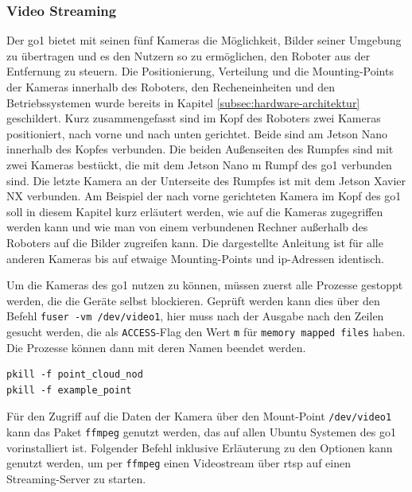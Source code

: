 \subsubsection{Video Streaming}
\label{subsubsec:video-streaming}

Der \gls{go1} bietet mit seinen fünf Kameras die Möglichkeit, Bilder seiner Umgebung zu übertragen und es den Nutzern so
zu ermöglichen, den Roboter aus der Entfernung zu steuern.
Die Positionierung, Verteilung und die Mounting-Points der Kameras innerhalb des Roboters, den Recheneinheiten und den
Betriebssystemen wurde bereits in Kapitel \ref{subsec:hardware-architektur} geschildert.
Kurz zusammengefasst sind im Kopf des Roboters zwei Kameras positioniert, nach vorne und nach unten gerichtet.
Beide sind am Jetson Nano innerhalb des Kopfes verbunden.
Die beiden Außenseiten des Rumpfes sind mit zwei Kameras bestückt, die mit dem Jetson Nano m Rumpf des \gls{go1} verbunden sind.
Die letzte Kamera an der Unterseite des Rumpfes ist mit dem Jetson Xavier NX verbunden.
Am Beispiel der nach vorne gerichteten Kamera im Kopf des \gls{go1} soll in diesem Kapitel kurz erläutert werden,
wie auf die Kameras zugegriffen werden kann und wie man von einem verbundenen Rechner außerhalb des Roboters auf die Bilder
zugreifen kann.
Die dargestellte Anleitung ist für alle anderen Kameras bis auf etwaige Mounting-Points und \gls{ip}-Adressen identisch.


Um die Kameras des \gls{go1} nutzen zu können, müssen zuerst alle Prozesse gestoppt werden, die die Geräte selbst blockieren.
Geprüft werden kann dies über den Befehl \texttt{fuser -vm /dev/\allowbreak video1}, hier muss nach der Ausgabe nach den Zeilen gesucht werden,
die als \texttt{ACCESS}-Flag den Wert \texttt{m} für \texttt{memory mapped files} haben.
Die Prozesse können dann mit deren Namen beendet werden.

\begin{lstlisting}
pkill -f point_cloud_nod
pkill -f example_point
\end{lstlisting}

\noindent Für den Zugriff auf die Daten der Kamera über den Mount-Point \texttt{/dev/\allowbreak video1} kann das Paket \texttt{ffmpeg}
genutzt werden, das auf allen Ubuntu Systemen des \gls{go1} vorinstalliert ist.
Folgender Befehl inklusive Erläuterung zu den Optionen kann genutzt werden, um per \texttt{ffmpeg} einen Videostream
über \gls{rtsp} auf einen Streaming-Server zu starten.


